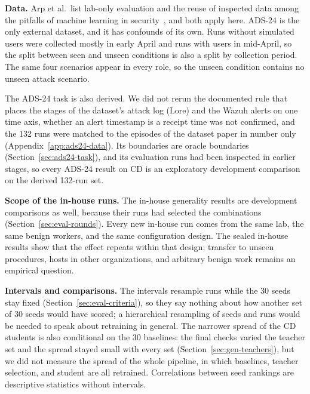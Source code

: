 \textbf{Data.}
Arp et al.\ list lab-only evaluation and the reuse of inspected data
among the pitfalls of machine learning in security~\cite{arp2020dos},
and both apply here.
ADS-24 is the only external dataset, and it has
confounds of its own. Runs without simulated users were collected
mostly in early April and runs with users in mid-April, so the split
between seen and unseen conditions is also a split by collection
period. The same four scenarios appear in every role, so the unseen
condition contains no unseen attack scenario.

The ADS-24 task is also derived. We did not rerun the documented rule
that places the stages of the dataset's attack log (Lore) and the
Wazuh alerts on one time axis, whether an
alert timestamp is a receipt time was not confirmed, and the 132 runs
were matched to the episodes of the dataset paper in number only
(Appendix~\ref{app:ads24-data}). Its boundaries are oracle boundaries
(Section~\ref{sec:ads24-task}), and its evaluation runs had been
inspected in earlier stages, so every ADS-24 result on CD is an
exploratory development comparison on the derived 132-run set.

\textbf{Scope of the in-house runs.}
The in-house generality results are development comparisons as well,
because their runs had selected the combinations
(Section~\ref{sec:eval-rounds}). Every new in-house run comes from the
same lab, the same benign workers, and the same configuration design.
The sealed in-house results show that the effect repeats within that
design; transfer to unseen procedures, hosts in other organizations,
and arbitrary benign work remains an empirical question.

\textbf{Intervals and comparisons.}
The intervals resample runs while the 30 seeds stay fixed
(Section~\ref{sec:eval-criteria}), so they say nothing about how
another set of 30 seeds would have scored; a hierarchical resampling of
seeds and runs would be needed to speak about retraining in general.
The narrower spread of the CD students is also conditional on the
30 baselines: the final checks varied the teacher set and the spread
stayed small with every set (Section~\ref{sec:gen-teachers}), but we
did not measure the spread of the whole pipeline, in which baselines,
teacher selection, and student are all retrained. Correlations between
seed rankings are descriptive statistics without intervals.

